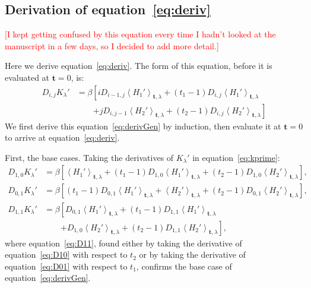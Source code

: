 \documentclass{article}
\newcommand{\warning}[1]{{\textsf{{\textcolor{red}{{[#1]}{}}}}}}
\let\vec\mathbf
\begin{document}
\begin{appendices}
\section{Derivation of equation~\ref{eq:deriv}}
\label{app:Derivation}
\warning{I kept getting confused by this equation every time I hadn't looked at the manuscript in a few days, so I decided to add more detail.}

Here we derive equation~\ref{eq:deriv}. The form of this equation, before it is evaluated at $\vec{t}=0$, is:
\begin{align}
D_{i,j}K_\lambda'&=
	\beta\left[
		i D_{i-1,j} \left \langle H_1' \right \rangle_{\vec t, \lambda}  + \left(t_1-1\right) D_{i,j} \left \langle H_1' \right \rangle_{\vec t, \lambda} 
	\right. \nonumber \\ & \qquad \left. 
		+ j D_{i,j-1} \left \langle H_2' \right \rangle_{\vec t, \lambda}   + \left(t_2-1\right) D_{i,j} \left \langle H_2' \right \rangle_{\vec t, \lambda}  \right]
\label{eq:derivGen}
\end{align}
We first derive this equation~\ref{eq:derivGen} by induction, then evaluate it at $\vec{t}=0$ to arrive at equation~\ref{eq:deriv}. 
	
 First, the base cases. Taking the derivatives of $K_{\lambda}'$ in equation~\ref{eq:kprime}: 
\begin{align}
D_{1,0} K_{\lambda}' & = 
	\beta \left[ \left \langle H_1' \right \rangle_{\vec t, \lambda}  + \left(t_1-1\right) D_{1,0} \left \langle H_1' \right \rangle_{\vec t, \lambda}  + \left(t_2-1\right) D_{1,0} \left \langle H_2' \right \rangle_{\vec t, \lambda}  \right], 
\label{eq:D10} \\ 
D_{0,1} K_{\lambda}' & = 
	 \beta  \left[ \left(t_1-1\right) D_{0,1} \left \langle H_1' \right \rangle_{\vec t, \lambda}  + \left \langle H_2' \right \rangle_{\vec t, \lambda}  + \left(t_2-1\right) D_{0,1} \left \langle H_2' \right \rangle_{\vec t, \lambda}   \right], 
\label{eq:D01} \\ 
D_{1,1} K_{\lambda}' & = 
 	\beta \left[ D_{0,1} \left \langle H_1' \right \rangle_{\vec t, \lambda}  + \left(t_1-1\right) D_{1,1} \left \langle H_1' \right \rangle_{\vec t, \lambda} 
	\right. \nonumber \\ & \qquad \left. 
	+ D_{1,0} \left \langle H_2' \right \rangle_{\vec t, \lambda}  + \left(t_2-1\right) D_{1,1} \left \langle H_2' \right \rangle_{\vec t, \lambda}  \right], 
\label{eq:D11}
\end{align}
where equation~\ref{eq:D11}, found either by taking the derivative of equation~\ref{eq:D10} with respect to $t_2$ or by taking the derivative of equation~\ref{eq:D01} with respect to $t_1$, confirms the base case of equation~\ref{eq:derivGen}. 


\end{appendices}
\end{document}
